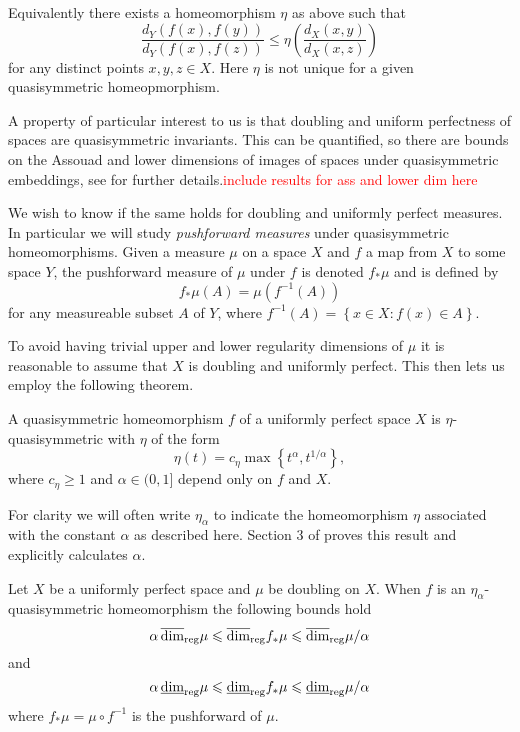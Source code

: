 Equivalently there exists a homeomorphism $\eta$ as above such that 
\[
\frac{d_Y(f(x),f(y))}{d_Y(f(x),f(z))} \le \eta \left(\frac{d_X(x,y)}{d_X(x,z)} \right)
\]
for any distinct points $x,y,z \in X$. Here $\eta$ is not unique for a given quasisymmetric homeopmorphism. 


A property of particular interest to us is that doubling and uniform perfectness of spaces are quasisymmetric invariants. This can be quantified, so there are bounds on the Assouad and lower dimensions of images of spaces under quasisymmetric embeddings, see \cite{heinonen} for further details.\textcolor{red}{include results for ass and lower dim here} 

We wish to know if the same holds for doubling and uniformly perfect measures. In particular we will study \textit{pushforward measures} under quasisymmetric homeomorphisms. Given a measure $\mu$ on a space $X$ and $f$ a map from $X$ to some space $Y$, the pushforward measure of $\mu$ under $f$ is denoted $f_*\mu$ and is defined by
\[
f_*\mu (A) = \mu(f^{-1}(A))
\]
for any measureable subset $A$ of $Y$, where $f^{-1}(A) = \left\{x \in X \colon f(x) \in A \right\}$. 

To avoid having trivial upper and lower regularity dimensions of $\mu$ it is reasonable to assume that $X$ is doubling and uniformly perfect. This then lets us employ the following theorem. 

\begin{theorem}
	A quasisymmetric homeomorphism $f$ of a uniformly perfect space $X$ is $\eta$-quasisymmetric with $\eta$ of the form
	\[
	\eta(t) = c_\eta \max\left\{t^\alpha, t^{1/\alpha}\right\},
	\]
	where $c_\eta \ge 1 $ and $\alpha \in (0,1]$ depend only on $f$ and $X$.
\end{theorem}

For clarity we will often write $\eta_{\alpha}$ to indicate the homeomorphism $\eta$ associated with the constant $\alpha$ as described here. Section 3 of \cite{tukia-vaisala} proves this result and explicitly calculates $\alpha$. 

\begin{theorem}\label{ch-quantifying:quaisymm-thm}
	Let $X$ be a uniformly perfect space and $\mu$ be doubling on $X$. When $f$ is an $\eta_\alpha$-quasisymmetric homeomorphism the following bounds hold
	\[
	\alpha \, \overline{\dim}_{\textup{reg}} \mu \leqslant \overline{\dim}_{\textup{reg}} f_{*}\mu \leqslant \overline{\dim}_{\textup{reg}} \mu/\alpha
	\]
	and 
	\[
	\alpha \, \underline{\dim}_{\textup{reg}} \mu \leqslant \underline{\dim}_{\textup{reg}} f_{*}\mu \leqslant \underline{\dim}_{\textup{reg}} \mu/\alpha
	\]
	where $f_{*}\mu = \mu \circ f^{-1}$ is the pushforward of $\mu$.
\end{theorem}

